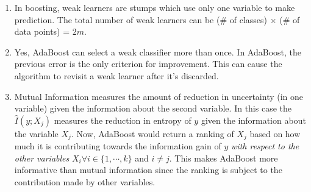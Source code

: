 \begin{enumerate}
                        
	\item In boosting, weak learners are stumps which use only one variable to make prediction. The total number of weak learners can be (\# of classes) $\times$ (\# of data points) = $2m$.
	
	\item Yes, AdaBoost can select a weak classifier more than once. In AdaBoost, the previous error is the only criterion for improvement. This can cause the algorithm to revisit a weak learner after it's discarded.
	
	\item Mutual Information measures the amount of reduction in uncertainty (in one variable) given the information about the second variable. In this case the $\hat{I}(y; X_{j})$ measures the reduction in entropy of $y$ given the information about the variable $X_{j}$. Now, AdaBoost would return a ranking of $X_{j}$ based on how much it is contributing towards the information gain of $y$ \textit{with respect to the other variables} $X_{i} \forall i \in \{ 1, \cdots, k \}$ and $i \neq j$. This makes AdaBoost more informative than mutual information since the ranking is subject to the contribution made by other variables.
	    		                            
\end{enumerate}